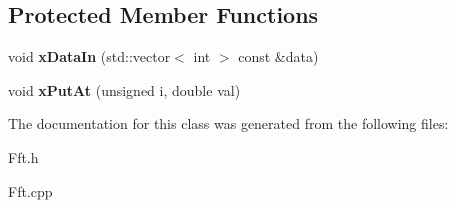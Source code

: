 \subsection*{Protected Member Functions}
\begin{DoxyCompactItemize}
\item 
\hypertarget{class_c_fft_afa995f75cfe4557dd6331aea5a3a6443}{void {\bfseries x\-Data\-In} (std\-::vector$<$ int $>$ const \&data)}\label{class_c_fft_afa995f75cfe4557dd6331aea5a3a6443}

\item 
\hypertarget{class_c_fft_a07fa1406535fdbe1d48d1ccca32e6aae}{void {\bfseries x\-Put\-At} (unsigned i, double val)}\label{class_c_fft_a07fa1406535fdbe1d48d1ccca32e6aae}

\end{DoxyCompactItemize}


The documentation for this class was generated from the following files\-:\begin{DoxyCompactItemize}
\item 
Fft.\-h\item 
Fft.\-cpp\end{DoxyCompactItemize}
